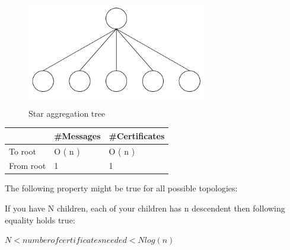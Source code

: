 	\begin{figure}[t]\label{star-aggregation-tree}
		\centering
			\includegraphics[width=0.7\textwidth]{images/star-tree.png}\\
			\caption{Star aggregation tree}
	\end{figure}
	\begin{tabular}{ | l | l | l |}
		\hline
			\ & \#Messages & \#Certificates \\
		\hline
			To root	& O ( n ) & O ( n ) \\
		\hline
			From root & 1 & 1 \\
		\hline 
	\end{tabular}
		\newline
		\newline


The following property might be true for all possible topologies:

If you have N children, each of your children has n descendent then following equality holds true:

$ N < number of certificates needed < N log(n) $